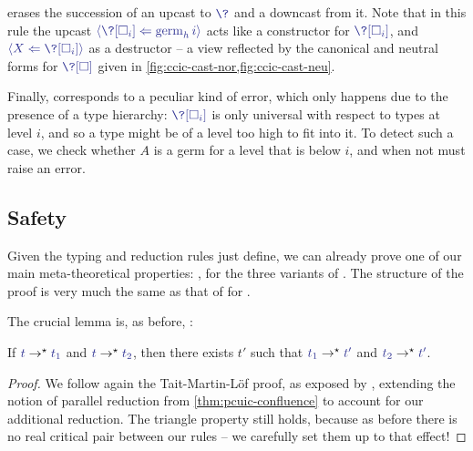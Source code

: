  erases the succession of an upcast to $\tcol{\?}$
and a downcast from it. Note that in this rule the upcast
$\tcol{\castrev{}{\stalkCIC{h}{i}}{\?[\uni[i]]}}$ acts like a constructor for
$\tcol{\?[\uni[i]]}$, and $\tcol{\castrev{}{\?[\uni[i]]}{X}}$ as a destructor –
a view reflected by the canonical and neutral forms for $\tcol{\?[\uni]}$ given in
\cref{fig:ccic-cast-nor,fig:ccic-cast-neu}.%
%

Finally,  corresponds to a peculiar kind of error, which only happens due to the presence of a type hierarchy: 
$\tcol{\?[\uni[i]]}$ is only universal with respect to types at level $i$, and so a type might
be of a level too high to fit into it.
To detect such a case, we check whether $A$ is a germ for a level that is below $i$,
and when not must raise an error.

\subsection{Safety}

Given the typing and reduction rules just define, we can already prove one of our main
meta-theoretical properties:
, for the three variants of .
The structure of the proof is very much the same as that of  for
.

%
The crucial lemma is, as before, :

\begin{lemma}
  \label{thm:ccic-confluence}
  If $\tcol{t} \red \tcol{t_1}$ and $\tcol{t} \red \tcol{t_2}$,
  then there exists $t'$ such that $\tcol{t_1} \red \tcol{t'}$ and $\tcol{t_2} \red \tcol{t'}$.
\end{lemma}

\begin{proof}

  We follow again the Tait-Martin-Löf proof, as exposed by ,
  extending the notion of parallel reduction from \cref{thm:pcuic-confluence}
  to account for our additional reduction. The triangle property still holds,
  because as before there is no real critical pair between our rules – we carefully set
  them up to that effect!
  
\end{proof}

